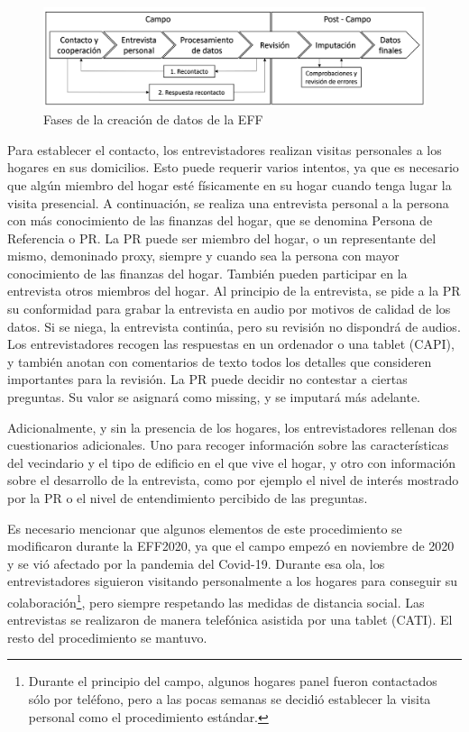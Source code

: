 \begin{figure}[h]
	\centering
	\includegraphics[width=1\textwidth]{figs/fases_creacion_datos_eff.png}
	\caption{Fases de la creación de datos de la EFF}
	\label{fig:eff_phases}
\end{figure}

Para establecer el contacto, los entrevistadores realizan visitas personales a los hogares en sus domicilios. Esto puede requerir varios intentos, ya que es necesario que algún miembro del hogar esté físicamente en su hogar cuando tenga lugar la visita presencial. A continuación, se realiza una entrevista personal a la persona con más conocimiento de las finanzas del hogar, que se denomina Persona de Referencia o PR. La PR puede ser miembro del hogar, o un representante del mismo, demoninado proxy, siempre y cuando sea la persona con mayor conocimiento de las finanzas del hogar. También pueden participar en la entrevista otros miembros del hogar. Al principio de la entrevista, se pide a la PR su conformidad para grabar la entrevista en audio por motivos de calidad de los datos. Si se niega, la entrevista continúa, pero su revisión no dispondrá de audios. Los entrevistadores recogen las respuestas en un ordenador o una tablet (CAPI), y también anotan con comentarios de texto todos los detalles que consideren importantes para la revisión. La PR puede decidir no contestar a ciertas preguntas. Su valor se asignará como missing, y se imputará más adelante.

Adicionalmente, y sin la presencia de los hogares, los entrevistadores rellenan dos cuestionarios adicionales. Uno para recoger información sobre las características del vecindario y el tipo de edificio en el que vive el hogar, y otro con información sobre el desarrollo de la entrevista, como por ejemplo el nivel de interés mostrado por la PR o el nivel de entendimiento percibido de las preguntas.

Es necesario mencionar que algunos elementos de este procedimiento se modificaron durante la EFF2020, ya que el campo empezó en noviembre de 2020 y se vió afectado por la pandemia del Covid-19. Durante esa ola, los entrevistadores siguieron visitando personalmente a los hogares para conseguir su colaboración\footnote{Durante el principio del campo, algunos hogares panel fueron contactados sólo por teléfono, pero a las pocas semanas se decidió establecer la visita personal como el procedimiento estándar.}, pero siempre respetando las medidas de distancia social. Las entrevistas se realizaron de manera telefónica asistida por una tablet (CATI). El resto del procedimiento se mantuvo.

